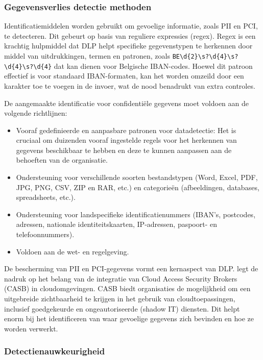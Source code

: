 \subsubsection{Gegevensverlies detectie methoden}

Identificatiemiddelen worden gebruikt om gevoelige informatie, zoals PII en PCI, te detecteren. 
Dit gebeurt op basis van reguliere expressies (regex). 
Regex is een krachtig hulpmiddel dat DLP helpt specifieke gegevenstypen te herkennen door middel van uitdrukkingen, termen en patronen, 
zoals \texttt{BE\textbackslash d\{2\}\textbackslash s?\textbackslash d\{4\}\textbackslash s?\textbackslash d\{4\}\textbackslash s?\textbackslash d\{4\}} 
dat kan dienen voor Belgische IBAN-codes. Hoewel dit patroon effectief is voor standaard IBAN-formaten, kan het worden omzeild door een karakter toe te voegen in de invoer, 
wat de nood benadrukt van extra controles. 

De aangemaakte identificatie voor confidentiële gegevens moet voldoen aan de volgende richtlijnen:

\begin{itemize}
    \item Vooraf gedefinieerde en aanpasbare patronen voor datadetectie: Het is cruciaal om duizenden vooraf ingestelde regels voor het herkennen van gegevens beschikbaar te hebben en deze te kunnen aanpassen aan de behoeften van de organisatie.
    \item Ondersteuning voor verschillende soorten bestandstypen (Word, Excel, PDF, JPG, PNG, CSV, ZIP en RAR, etc.) en categorieën (afbeeldingen, databases, spreadsheets, etc.).
    \item Ondersteuning voor landspecifieke identificatienummers (IBAN's, postcodes, adressen, nationale identiteitskaarten, IP-adressen, paspoort- en telefoonnummers).
    \item Voldoen aan de wet- en regelgeving.
\end{itemize}

De bescherming van PII en PCI-gegevens vormt een kernaspect van DLP. \textcite{Wason2020CASB} legt de nadruk op het belang van de integratie van Cloud Access Security Brokers (CASB) in cloudomgevingen. 
CASB biedt organisaties de mogelijkheid om een uitgebreide zichtbaarheid te krijgen in het gebruik van cloudtoepassingen, inclusief goedgekeurde en ongeautoriseerde (shadow IT) diensten. 
Dit helpt enorm bij het identificeren van waar gevoelige gegevens zich bevinden en hoe ze worden verwerkt.

\subsubsection{Detectienauwkeurigheid}

